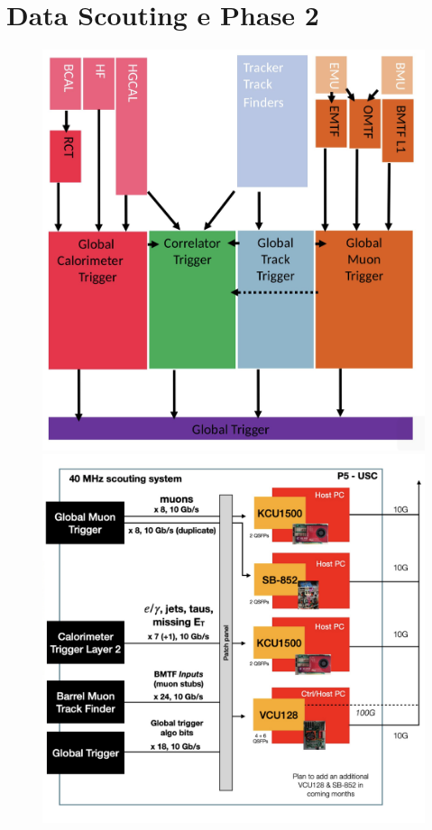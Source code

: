 \section{Data Scouting e Phase 2}
\label{sec:DataScouting}


\begin{figure}[t]
  \centering
  \begin{minipage}[b]{0.43\textwidth}
      \centering
      \includegraphics[width=\textwidth]{../ImmaginiTesi/Phase2.png} 
    \end{minipage}
    \hfill 
    \begin{minipage}[b]{0.48\textwidth}
      \centering
      \includegraphics[width=\textwidth]{../ImmaginiTesi/DataScoutingRun3.png} 
  \end{minipage}
  \caption{}
  \label{fig:Scouting}
\end{figure}

